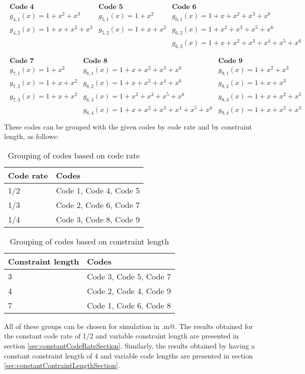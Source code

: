 \begin{align*}
\begin{matrix}
\textbf{Code 4}&\textbf{Code 5}&\textbf{Code 6}\\
g_{4,1}(x) = 1 + x^2 + x^3&g_{5,1}(x) = 1 + x^2&g_{6,1}(x)=1 + x + x^2 + x^3 + x^6\\
g_{4,2}(x) = 1+x+x^2+x^3&g_{5,2}(x) = 1+x+x^2&g_{6,2}(x)=1 + x^2 + x^3 + x^5 + x^6\\
&&g_{6,3}(x)=1 + x + x^2 + x^3 + x^4 + x^5 + x^6\\
\end{matrix}\\
\begin{matrix}
\textbf{Code 7}&\textbf{Code 8}&\textbf{Code 9}\\
g_{7,1}(x) = 1 + x^2&g_{8,1}(x) = 1 + x + x^2 + x^3 + x^6&g_{9,1}(x)=1 + x^2 + x^3\\
g_{7,2}(x) = 1+x+x^2&g_{8,2}(x) = 1 + x + x^3 + x^4 + x^6&g_{9,2}(x)=1 + x + x^3\\
g_{7,3}(x) = 1+x+x^2&g_{8,3}(x) = 1 + x^2 + x^3 + x^5 + x^6&g_{9,3}(x)=1+x+x^2+x^3\\
&g_{8,4}(x) = 1 + x + x^2 + x^3 + x^4 + x^5 + x^6&g_{9,4}(x)=1+x+x^2+x^3\\
\end{matrix}
\end{align*}
These codes can be grouped with the given codes by code rate and by constraint length, as follows:
\begin{table}[h]
\centering
\begin{tabular}{ll}
\hline
Code rate &  Codes \\ \hline
1/2 & Code 1, Code 4, Code 5 \\
1/3 & Code 2, Code 6, Code 7 \\
1/4 & Code 3, Code 8, Code 9 \\
\end{tabular}
\caption{Grouping of codes based on code rate}
\end{table}

\begin{table}[h]
\centering
\begin{tabular}{ll}
\hline
Constraint length &  Codes \\ \hline
3 & Code 3, Code 5, Code 7 \\
4 & Code 2, Code 4, Code 9 \\
7 & Code 1, Code 6, Code 8 \\
\end{tabular}
\caption{Grouping of codes based on constraint length}
\end{table}

All of these groups can be chosen for simulation in \verb@trellisGenerator.m@. The results obtained for the constant code rate of 1/2 and variable constraint length are presented in section \ref{sec:constantCodeRateSection}. Similarly, the results obtained by having a constant constraint length of 4 and variable code lengths are presented in section \ref{sec:constantContraintLengthSection}.